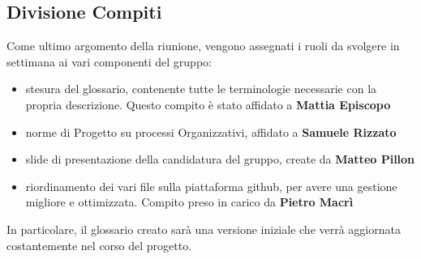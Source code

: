 \subsection{Divisione Compiti}
Come ultimo argomento della riunione, vengono assegnati i ruoli da svolgere in settimana ai vari componenti del gruppo:
 \begin{itemize}
 	\item stesura del glossario, contenente tutte le terminologie necessarie con la propria descrizione. Questo compito è stato affidato a \textbf{Mattia Episcopo} 
 	\item norme di Progetto su processi Organizzativi, affidato a \textbf{Samuele Rizzato} 
 	\item slide di presentazione della candidatura del gruppo, create da \textbf{Matteo Pillon} 
 	\item riordinamento dei vari file sulla piattaforma github, per avere una gestione migliore e ottimizzata. Compito preso in carico da \textbf{Pietro Macrì}
 \end{itemize}
In particolare, il glossario creato sarà una versione iniziale che verrà aggiornata costantemente nel corso del progetto.



